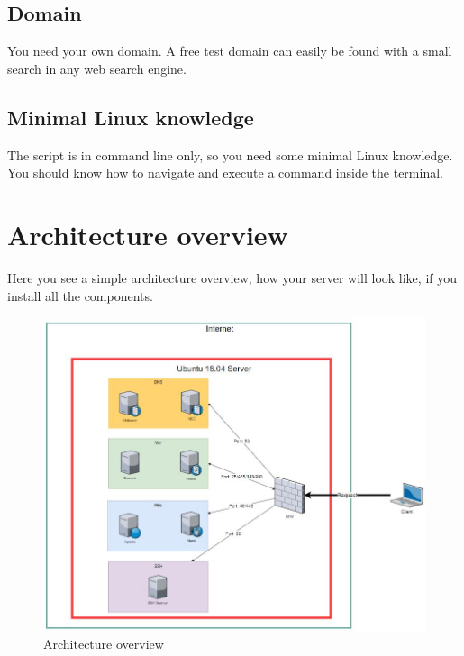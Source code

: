 \subsection{Domain}
You need your own domain. A free test domain can easily be found with a small search in any web search engine. 

\subsection{Minimal Linux knowledge}
The script is in command line only, so you need some minimal Linux knowledge. You should know how to navigate and execute a command inside the terminal.

\newpage
\section{Architecture overview}
Here you see a simple architecture overview, how your server will look like, if you install all the components.

\begin{figure}[H]
	\centering
	\includegraphics[width=0.9\linewidth]{diagram/overview_diagramm.JPG}
	\caption{Architecture overview}
	\label{fig:beforeWeb}
\end{figure}
